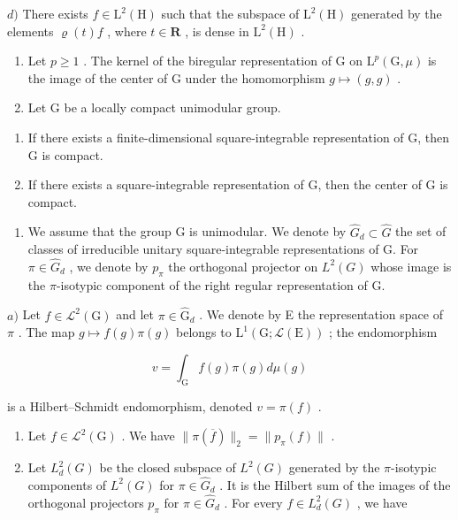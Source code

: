 \(d)\) There exists \(f \in \mathrm{L}^2(\mathrm{H})\) such that the subspace of \(\mathrm{L}^2(\mathrm{H})\) generated by the elements \(\varrho(t)f\) , where \(t \in \mathbf{R}\) , is dense in \(\mathrm{L}^2(\mathrm{H})\) .

\begin{enumerate}
\def\labelenumi{\arabic{enumi})}
\setcounter{enumi}{3}
\item
  Let \(p \geqslant 1\) . The kernel of the biregular representation of G on \(\mathrm{L}^{p}(\mathrm{G}, \mu)\) is the image of the center of G under the homomorphism \(g \mapsto (g, g)\) .
\item
  Let G be a locally compact unimodular group.
\end{enumerate}

\begin{enumerate}
\def\labelenumi{\alph{enumi})}
\item
  If there exists a finite-dimensional square-integrable representation of G, then G is compact.
\item
  If there exists a square-integrable representation of G, then the center of G is compact.
\end{enumerate}

\begin{enumerate}
\def\labelenumi{\arabic{enumi})}
\setcounter{enumi}{5}
\tightlist
\item
  We assume that the group G is unimodular. We denote by \(\widehat{G}_{d} \subset \widehat{G}\) the set of classes of irreducible unitary square-integrable representations of G. For \(\pi \in \widehat{G}_{d}\) , we denote by \(p_{\pi}\) the orthogonal projector on \(L^{2}(G)\) whose image is the \(\pi\)-isotypic component of the right regular representation of G.
\end{enumerate}

\(a)\) Let \(f \in \mathcal{L}^2(\mathrm{G})\) and let \(\pi \in \widehat{\mathrm{G}}_d\) . We denote by E the representation space of \(\pi\) . The map \(g \mapsto f(g)\pi(g)\) belongs to \(\mathrm{L}^1(\mathrm{G};\mathcal{L}(\mathrm{E}))\) ; the endomorphism

\[
v = \int_ {\mathrm{G}} f (g) \pi (g) d \mu (g)
\]

is a Hilbert--Schmidt endomorphism, denoted \(v = \pi(f)\) .

\begin{enumerate}
\def\labelenumi{\alph{enumi})}
\setcounter{enumi}{1}
\item
  Let \(f \in \mathcal{L}^2(\mathrm{G})\) . We have \(\| \pi(\overline{f}) \|_2 = \| p_\pi(f) \|\) .
\item
  Let \(L_{d}^{2}(G)\) be the closed subspace of \(L^{2}(G)\) generated by the \(\pi\)-isotypic components of \(L^{2}(G)\) for \(\pi \in \widehat{G}_{d}\) . It is the Hilbert sum of the images of the orthogonal projectors \(p_{\pi}\) for \(\pi \in \widehat{G}_{d}\) . For every \(f \in L_{d}^{2}(G)\) , we have
\end{enumerate}

